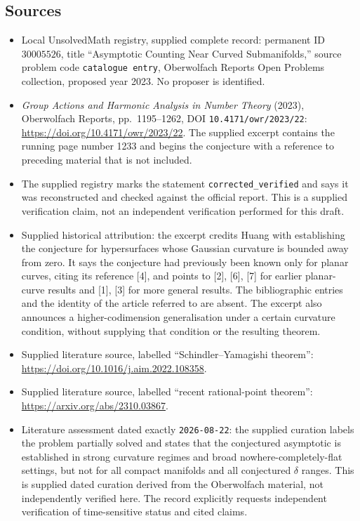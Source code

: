 \documentclass[11pt]{article}
\begin{document}
\subsection{Sources}
\begin{itemize}
\item Local UnsolvedMath registry, supplied complete record: permanent ID \(30005526\), title ``Asymptotic Counting Near Curved Submanifolds,'' source problem code \texttt{catalogue entry}, Oberwolfach Reports Open Problems collection, proposed year 2023. No proposer is identified.
\item \emph{Group Actions and Harmonic Analysis in Number Theory} (2023), Oberwolfach Reports, pp.\ 1195--1262, DOI \texttt{10.4171/owr/2023/22}: \url{https://doi.org/10.4171/owr/2023/22}. The supplied excerpt contains the running page number 1233 and begins the conjecture with a reference to preceding material that is not included.
\item The supplied registry marks the statement \texttt{corrected\_verified} and says it was reconstructed and checked against the official report. This is a supplied verification claim, not an independent verification performed for this draft.
\item Supplied historical attribution: the excerpt credits Huang with establishing the conjecture for hypersurfaces whose Gaussian curvature is bounded away from zero. It says the conjecture had previously been known only for planar curves, citing its reference [4], and points to [2], [6], [7] for earlier planar-curve results and [1], [3] for more general results. The bibliographic entries and the identity of the article referred to are absent. The excerpt also announces a higher-codimension generalisation under a certain curvature condition, without supplying that condition or the resulting theorem.
\item Supplied literature source, labelled ``Schindler--Yamagishi theorem'': \url{https://doi.org/10.1016/j.aim.2022.108358}.
\item Supplied literature source, labelled ``recent rational-point theorem'': \url{https://arxiv.org/abs/2310.03867}.
\item Literature assessment dated exactly \texttt{2026-08-22}: the supplied curation labels the problem partially solved and states that the conjectured asymptotic is established in strong curvature regimes and broad nowhere-completely-flat settings, but not for all compact manifolds and all conjectured \(\delta\) ranges. This is supplied dated curation derived from the Oberwolfach material, not independently verified here. The record explicitly requests independent verification of time-sensitive status and cited claims.
\end{itemize}
\end{document}
